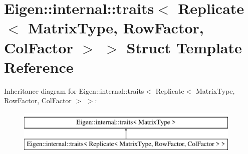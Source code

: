 \hypertarget{struct_eigen_1_1internal_1_1traits_3_01_replicate_3_01_matrix_type_00_01_row_factor_00_01_col_factor_01_4_01_4}{}\section{Eigen\+::internal\+::traits$<$ Replicate$<$ Matrix\+Type, Row\+Factor, Col\+Factor $>$ $>$ Struct Template Reference}
\label{struct_eigen_1_1internal_1_1traits_3_01_replicate_3_01_matrix_type_00_01_row_factor_00_01_col_factor_01_4_01_4}
Inheritance diagram for Eigen\+::internal\+::traits$<$ Replicate$<$ Matrix\+Type, Row\+Factor, Col\+Factor $>$ $>$\+:\begin{figure}[H]
\begin{center}
\leavevmode
\includegraphics[height=2.000000cm]{struct_eigen_1_1internal_1_1traits_3_01_replicate_3_01_matrix_type_00_01_row_factor_00_01_col_factor_01_4_01_4}
\end{center}
\end{figure}

